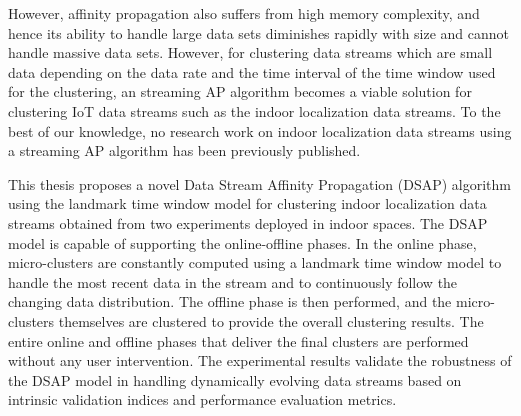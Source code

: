 However, affinity propagation also suffers from high memory complexity, and hence its ability to handle large data sets diminishes rapidly with size and cannot handle massive data sets. However, for clustering data streams which are small data depending on the data rate and the time interval of the time window used for the clustering, an streaming AP algorithm becomes a viable solution for clustering IoT data streams such as the indoor localization data streams. To the best of our knowledge, no research work on indoor localization data streams using a streaming AP algorithm has been previously published.

This thesis proposes a novel Data Stream Affinity Propagation (DSAP) algorithm using the landmark time window model for clustering indoor localization data streams obtained from two experiments deployed in indoor spaces. The DSAP model is capable of supporting the online-offline phases. In the online phase, micro-clusters are constantly computed using a landmark time window model to handle the most recent data in the stream and to continuously follow the changing data distribution. The offline phase is then performed, and the micro-clusters themselves are clustered to provide the overall clustering results. The entire online and offline phases that deliver the final clusters are performed without any user intervention. The experimental results validate the robustness of the DSAP model in handling dynamically evolving data streams based on intrinsic validation indices and performance evaluation metrics.



